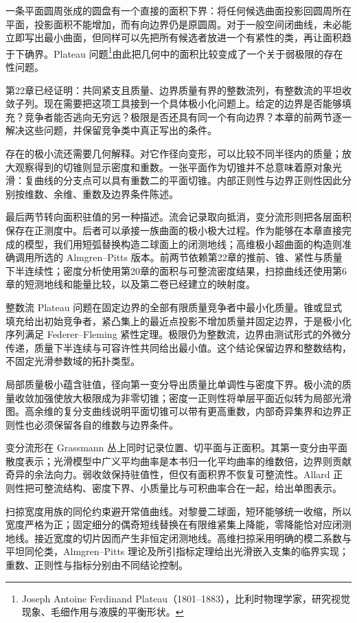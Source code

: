 一条平面圆周张成的圆盘有一个直接的面积下界：将任何候选曲面投影回圆周所在平面，投影面积不能增加，而有向边界仍是原圆周。对于一般空间闭曲线，未必能立即写出最小曲面，但同样可以先把所有候选者放进一个有紧性的类，再让面积趋于下确界。Plateau 问题\footnote{Joseph Antoine Ferdinand Plateau（1801--1883），比利时物理学家，研究视觉现象、毛细作用与液膜的平衡形状。}由此把几何中的面积比较变成了一个关于弱极限的存在性问题。

\ProseParagraphBreak
第22章已经证明：共同紧支且质量、边界质量有界的整数流列，有整数流的平坦收敛子列。现在需要把这项工具接到一个具体极小化问题上。给定的边界是否能够填充？竞争者能否逃向无穷远？极限是否还具有同一个有向边界？本章的前两节逐一解决这些问题，并保留竞争类中真正写出的条件。

\ProseParagraphBreak
存在的极小流还需要几何解释。对它作径向变形，可以比较不同半径内的质量；放大观察得到的切锥则显示密度和重数。一张平面作为切锥并不总意味着原对象光滑：复曲线的分支点可以具有重数二的平面切锥。内部正则性与边界正则性因此分别按维数、余维、重数及边界条件陈述。

\ProseParagraphBreak
最后两节转向面积驻值的另一种描述。流会记录取向抵消，变分流形则把各层面积保存在正测度中。后者可以承接一族曲面的极小极大过程。作为能够在本章直接完成的模型，我们用短弧替换构造二球面上的闭测地线；高维极小超曲面的构造则准确调用所选的 Almgren--Pitts 版本。前两节依赖第22章的推前、锥、紧性与质量下半连续性；密度分析使用第20章的面积与可整流密度结果，扫掠曲线还使用第6章的短测地线和能量比较，以及第二卷已经建立的映射度。







\begin{chaptersummary}
	整数流 Plateau 问题在固定边界的全部有限质量竞争者中最小化质量。锥或显式填充给出初始竞争者，紧凸集上的最近点投影不增加质量并固定边界，于是极小化序列满足 Federer--Fleming 紧性定理。极限仍为整数流，边界由测试形式的外微分传递，质量下半连续与可容许性共同给出最小值。这个结论保留边界和整数结构，不固定光滑参数域的拓扑类型。

	\ProseParagraphBreak
	局部质量极小蕴含驻值，径向第一变分导出质量比单调性与密度下界。极小流的质量收敛加强使放大极限成为非零切锥；密度一正则性将单层平面近似转为局部光滑图。高余维的复分支曲线说明平面切锥可以带有更高重数，内部奇异集界和边界正则性也必须保留各自的维数与边界条件。

	\ProseParagraphBreak
	变分流形在 Grassmann 丛上同时记录位置、切平面与正面积。其第一变分由平面散度表示；光滑模型中广义平均曲率是本书归一化平均曲率的维数倍，边界则贡献奇异的余法向力。弱收敛保持驻值性，但仅有面积界不恢复可整流性。Allard 正则性把可整流结构、密度下界、小质量比与可积曲率合在一起，给出单图表示。

	\ProseParagraphBreak
	扫掠宽度用族的同伦约束避开常值曲线。对黎曼二球面，短环能够统一收缩，所以宽度严格为正；固定细分的偶奇短线替换在有限维紧集上降能，零降能恰对应闭测地线。接近宽度的切片因而产生非恒定闭测地线。高维扫掠采用明确的模二系数与平坦同伦类，Almgren--Pitts 理论及所引指标定理给出光滑嵌入支集的临界实现；重数、正则性与指标分别由不同结论控制。
\end{chaptersummary}

